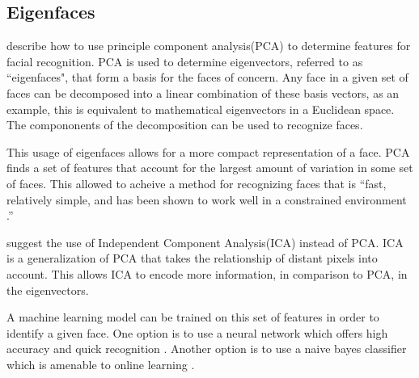 \subsection{Eigenfaces}
  \citeauthor{eigenFacesRecog} \cite{eigenFacesRecog} describe how to use principle component analysis(PCA) to determine features for facial recognition.
  PCA is used to determine eigenvectors, referred to as ``eigenfaces", that form a basis for the faces of concern.
  Any face in a given set of faces can be decomposed into a linear combination of these basis vectors, as an example, this is equivalent to mathematical eigenvectors in a Euclidean space.
  The compononents of the decomposition can be used to recognize faces.
  
  This usage of eigenfaces allows for a more compact representation of a face.
  PCA finds a set of features that account for the largest amount of variation in some set of faces.
  This allowed \citeauthor{eigenFacesRecog} to acheive a method for recognizing faces that is ``fast, relatively simple, and has been shown to work well in a constrained environment \cite{eigenFacesRecog}.'' 

  \citeauthor{ICAFaceRecog} \cite{ICAFaceRecog} suggest the use of Independent Component Analysis(ICA) instead of PCA.
  ICA is a generalization of PCA that takes the relationship of distant pixels into account.
  This allows ICA to encode more information, in comparison to PCA, in the eigenvectors.

  A machine learning model can be trained on this set of features in order to identify a given face.
  One option is to use a neural network which offers high accuracy and quick recognition \cite{eigenFacesRecog} \cite{ICAFaceRecog}.
  Another option is to use a naive bayes classifier which is amenable to online learning \cite{murphy2012}.
